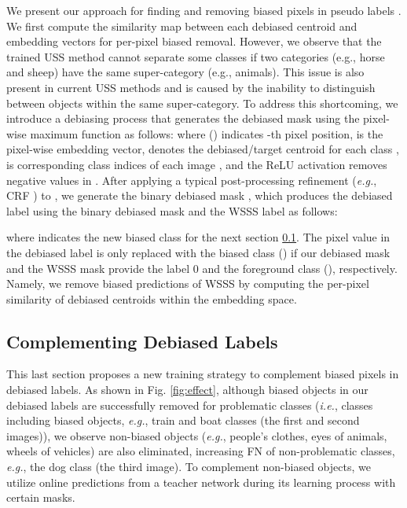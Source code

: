 \documentclass[10pt,twocolumn,letterpaper]{article}
\begin{document}
We present our approach for finding and removing biased pixels in pseudo labels . We first compute the similarity map between each debiased centroid  and embedding vectors  for per-pixel biased removal. However, we observe that the trained USS method cannot separate some classes if two categories (e.g., horse and sheep) have the same super-category (e.g., animals). This issue is also present in current USS methods \cite{cho2021picie, ziegler2022self, hamilton2022unsupervised} and is caused by the inability to distinguish between objects within the same super-category. To address this shortcoming, we introduce a debiasing process that generates the debiased mask  using the pixel-wise maximum function as follows: 
where () indicates -th pixel position,  is the pixel-wise embedding vector,  denotes the debiased/target centroid for each class ,  is corresponding class indices of each image , and the ReLU activation removes negative values in . After applying a typical post-processing refinement (\emph{e.g.}, CRF \cite{krahenbuhl2011efficient}) to , we generate the binary debiased mask , which produces the debiased label  using the binary debiased mask  and the WSSS label  as follows:
\begin{small}

\end{small}
where  indicates the new biased class for the next section \ref{sec:complementing}. The pixel value in the debiased label  is only replaced with the biased class () if our debiased mask  and the WSSS mask  provide the label 0 and the foreground class (), respectively. Namely, we remove biased predictions of WSSS by computing the per-pixel similarity of debiased centroids within the embedding space.

\subsection{Complementing Debiased Labels} \label{sec:complementing} 
This last section proposes a new training strategy to complement biased pixels in debiased labels. As shown in Fig. \ref{fig:effect}, although biased objects in our debiased labels are successfully removed for problematic classes (\emph{i.e.}, classes including biased objects, \emph{e.g.}, train and boat classes (the first and second images)), we observe non-biased objects (\emph{e.g.}, people's clothes, eyes of animals, wheels of vehicles) are also eliminated, increasing FN of non-problematic classes, \emph{e.g.}, the dog class (the third image). To complement non-biased objects, we utilize online predictions  from a teacher network during its learning process with certain masks.
\end{document}
